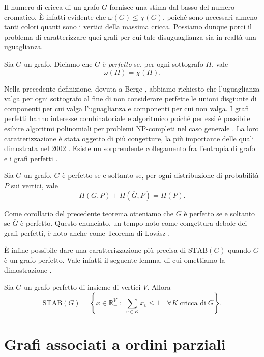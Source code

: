 Il numero di cricca di un grafo \(G\) fornisce una stima dal basso del numero cromatico. È infatti evidente che \(\omega(G)\le\chi(G)\), poiché sono necessari almeno tanti colori quanti sono i vertici della massima cricca. Possiamo dunque porci il problema di caratterizzare quei grafi per cui tale disuguaglianza sia in realtà una uguaglianza. 
\begin{definition}
  Sia \(G\) un grafo. Diciamo che \(G\) è \emph{perfetto} se, per ogni sottografo \(H\), vale
  \[\omega(H)=\chi(H).\]
\end{definition}
Nella precedente definizione, dovuta a Berge \cite{Berge1960}, abbiamo richiesto che l'uguaglianza valga per ogni sottografo al fine di non considerare perfette le unioni disgiunte di componenti per cui valga l'uguaglianza e componenti per cui non valga. I grafi perfetti hanno interesse combinatoriale e algoritmico poiché per essi è possibile esibire algoritmi polinomiali per problemi NP-completi nel caso generale \cite{Golumbic2004}. La loro caratterizzazione è stata oggetto di più congetture, la più importante delle quali dimostrata nel 2002 \cite{Chudnovsky2006}. Esiste un sorprendente collegamento fra l'entropia di grafo e i grafi perfetti \cite{Csiszar1990}. 
\begin{theorem}
   \label{lovasztheorem} Sia \(G\) un grafo. \(G\) è perfetto se e soltanto se, per ogni distribuzione di probabilità \(P\) sui vertici, vale
  \[H\left(G,P\right)+H\left(\overline{G},P\right)=H(P).\]
\end{theorem}
Come corollario del precedente teorema otteniamo che \(G\) è perfetto se e soltanto se \(\overline{G}\) è perfetto. Questo enunciato, un tempo noto come congettura debole dei grafi perfetti, è noto anche come Teorema di Lovász \cite{Lovasz1972}.

È infine possibile dare una caratterizzazione più precisa di \(\text{STAB}(G)\) quando \(G\) è un grafo perfetto. Vale infatti il seguente lemma, di cui omettiamo la dimostrazione \cite{Chvatal1975}.

\begin{lemma}
  [Chvatál] \label{chvatallemma} Sia \(G\) un grafo perfetto di insieme di vertici \(V\). Allora
  \[
  \text{STAB}(G) = \left\{x\in \mathbb{R}_{+}^V\;:\;\sum_{v\in K}{x_v}\le 1\quad \forall K\;\text{cricca di}\;G\right\}\text{.}
  \]
\end{lemma}

\section{Grafi associati a ordini parziali}

